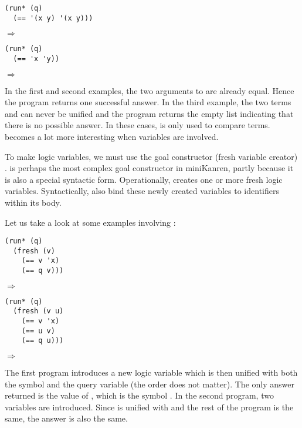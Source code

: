 \begin{lstlisting}
(run* (q)
  (== '(x y) '(x y)))
\end{lstlisting}
$\Rightarrow$ 

\begin{lstlisting}
(run* (q)
  (== 'x 'y))
\end{lstlisting}
$\Rightarrow$ \code{()}

In the first and second examples, the two arguments to \code{==} are already equal. Hence the program returns one successful answer. In the third example, the two terms  and  can never be unified and the program returns the empty list indicating that there is no possible answer. In these cases, \code{==} is only used to compare terms. \code{==} becomes a lot more interesting when variables are involved.

To make logic variables, we must use the goal constructor (fresh variable creator) .  is perhaps the most complex goal constructor in miniKanren, partly because it is also a special syntactic form. Operationally,  creates one or more fresh logic variables. Syntactically,  also bind these newly created variables to identifiers within its body.

Let us take a look at some examples involving :

\begin{lstlisting}
(run* (q)
  (fresh (v)
    (== v 'x)
    (== q v)))
\end{lstlisting}
$\Rightarrow$ 

\begin{lstlisting}
(run* (q)
  (fresh (v u)
    (== v 'x)
    (== u v)
    (== q u)))
\end{lstlisting}
$\Rightarrow$ 

The first program introduces a new logic variable  which is then unified with both the symbol  and the query variable  (the order does not matter). The only answer returned is the value of , which is the symbol . In the second program, two variables are introduced. Since  is unified with  and the rest of the program is the same, the answer is also the same.

